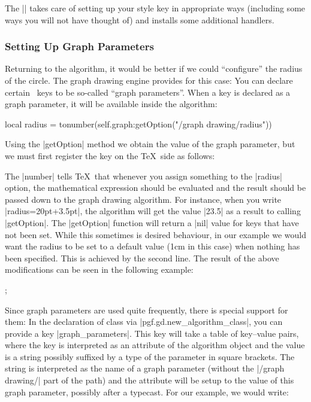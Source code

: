 The |\pgfgddeclarealgorithmkey| takes care of setting up your style
key in appropriate ways (including some ways you will not have thought
of) and installs some additional handlers.


\subsubsection{Setting Up Graph Parameters}

Returning to the algorithm, it would be better if we could
``configure'' the radius of the circle. The graph drawing engine
provides for this case: You can declare certain \pgfname\ keys to be
so-called ``graph parameters''. When a key is declared as a graph
parameter, it will be available inside the algorithm: 

\begin{codeexample}
local radius = tonumber(self.graph:getOption("/graph drawing/radius"))
\end{codeexample}

Using the |getOption| method we obtain the value of the
graph parameter, but we must first register the key on the \TeX\ side
as follows: 

\begin{codeexample}
\end{codeexample}

The |number| tells \TeX\ that whenever you assign
something to the |radius| option, the mathematical expression should
be evaluated and the result should be passed down to the graph drawing
algorithm. For instance, when you write |radius=20pt+3.5pt|, the
algorithm will get the value |23.5| as a result to calling
|getOption|. The |getOption| function will return a |nil| value for
keys that have not been set. While this sometimes is desired
behaviour, in our example we would want the radius to be set to a
default value (1cm in this case) when nothing has been specified. This
is achieved by the second line. The result of the above modifications
can be seen in the following example:

\begin{codeexample}[]
\tikz {};
\end{codeexample}

Since graph parameters are used quite frequently, there is special
support for them: In the declaration of class via
|pgf.gd.new_algorithm_class|, you can provide a key
|graph_parameters|. This key will take a table of key--value pairs,
where the key is interpreted as an attribute of the algorithm object
and the value is a string possibly suffixed by a type of the parameter
in square brackets. The string is interpreted as the name of a graph
parameter (without the |/graph drawing/| part of the path) and the
attribute will be setup to the value of this graph parameter, possibly
after a typecast. For our example, we would write:

